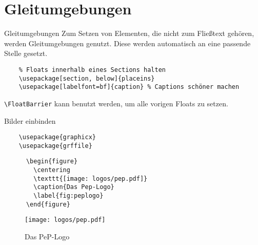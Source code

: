 \section{Gleitumgebungen}

\begin{frame}[fragile]{Gleitumgebungen}
  Zum Setzen von Elementen, die nicht zum Fließtext gehören, werden Gleitumgebungen genutzt.
  Diese werden automatisch an eine passende Stelle gesetzt.

  \begin{Packages}
    \begin{lstlisting}
    % Floats innerhalb eines Sections halten
    \usepackage[section, below]{placeins}
    \usepackage[labelfont=bf]{caption} % Captions schöner machen
    \end{lstlisting}
  \end{Packages}

  \lstinline+\FloatBarrier+ kann benutzt werden, um alle vorigen Floats zu setzen.
\end{frame}

\begin{frame}[fragile]{Bilder einbinden}
  \begin{Packages}
    \begin{lstlisting}
    \usepackage{graphicx}
    \usepackage{grffile}
    \end{lstlisting}
  \end{Packages}
  \begin{CodeExample}{0.60}
    \begin{lstlisting}
      \begin{figure}
        \centering
        \texttt{[image: logos/pep.pdf]}
        \caption{Das Pep-Logo}
        \label{fig:peplogo}
      \end{figure}
    \end{lstlisting}
  \CodeResult
    \begin{figure}
      \centering
      \texttt{[image: logos/pep.pdf]}
      \caption{Das PeP-Logo}
      \label{fig:peplogo}
    \end{figure}
  \end{CodeExample}
\end{frame}
